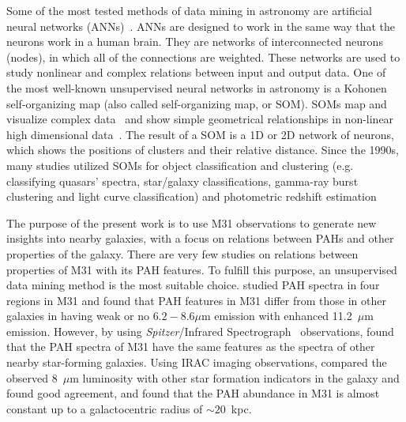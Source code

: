 Some of the most tested methods of data mining in astronomy are artificial neural networks (ANNs)~\citep[e.g.][and references therein]{ Hossein14,Hossein16}.
ANNs are designed to work in the same way that the neurons work in a human brain.
They are networks of interconnected neurons (nodes), in which all of the connections are weighted.
These networks are used to study nonlinear and complex relations between input and output data.
One of the most well-known unsupervised neural networks in astronomy is a Kohonen self-organizing map (also called self-organizing map, or SOM).
SOMs map and visualize complex data~\citep{Kohonen82} and show simple geometrical relationships in non-linear high dimensional data~\citep{Kohonen98}.
The result of a SOM is a 1D or 2D network of neurons, which shows the positions of clusters and their relative distance.
Since the 1990s, many studies utilized SOMs for object classification and clustering (e.g. classifying quasars' spectra, star/galaxy classifications, gamma-ray burst clustering and light curve classification) and photometric redshift estimation~\citep[e.g.][]{Odewahn92, Hernandez94, Murtagh95, Maehoenen95,Scaringi09,Geach12,Fustes13,Meusinger16,Rahmani16b} %

The purpose of the present work is to use M31 observations to generate new insights into nearby galaxies, with a focus on relations between PAHs and other properties of the galaxy.
There are very few studies on relations between properties of M31 with its PAH features.
To fulfill this purpose, an unsupervised data mining method is the most suitable choice.
\cite{Cesarsky98} studied PAH spectra in four regions in M31 and found that PAH features in M31 differ from those in other galaxies in having weak or no $6.2 - 8.6\mu$m emission with enhanced 11.2~$\mu$m emission. 
However, \cite{Dim15} by using {\it Spitzer}/Infrared Spectrograph~\citep[IRS,][]{Houck04b} observations, found that the PAH spectra of M31 have the same features as the spectra of other nearby star-forming galaxies.
Using IRAC imaging observations,\cite{Barmby06} compared the observed 8~$\mu$m luminosity with other star formation indicators in the galaxy and found good agreement, and \cite{Draine14} found that the PAH abundance in M31 is almost constant up to a galactocentric radius of $\sim 20$~kpc.

